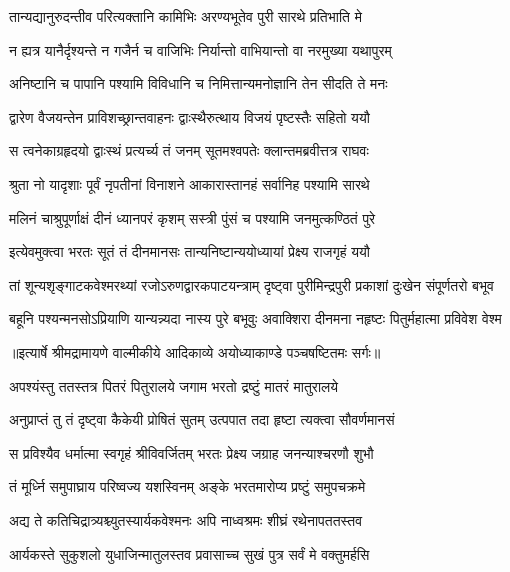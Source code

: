 \twolineshloka
{तान्यद्यानुरुदन्तीव परित्यक्तानि कामिभिः}
{अरण्यभूतेव पुरी सारथे प्रतिभाति मे} %

\twolineshloka
{न ह्यत्र यानैर्दृश्यन्ते न गजैर्न च वाजिभिः}
{निर्यान्तो वाभियान्तो वा नरमुख्या यथापुरम्} %

\twolineshloka
{अनिष्टानि च पापानि पश्यामि विविधानि च}
{निमित्तान्यमनोज्ञानि तेन सीदति ते मनः} %

\twolineshloka
{द्वारेण वैजयन्तेन प्राविशच्छ्रान्तवाहनः}
{द्वाःस्थैरुत्थाय विजयं पृष्टस्तैः सहितो ययौ} %

\twolineshloka
{स त्वनेकाग्रहृदयो द्वाःस्थं प्रत्यर्च्य तं जनम्}
{सूतमश्वपतेः क्लान्तमब्रवीत्तत्र राघवः} %

\twolineshloka
{श्रुता नो यादृशाः पूर्वं नृपतीनां विनाशने}
{आकारास्तानहं सर्वानिह पश्यामि सारथे} %

\twolineshloka
{मलिनं चाश्रुपूर्णाक्षं दीनं ध्यानपरं कृशम्}
{सस्त्री पुंसं च पश्यामि जनमुत्कण्ठितं पुरे} %

\twolineshloka
{इत्येवमुक्त्वा भरतः सूतं तं दीनमानसः}
{तान्यनिष्टान्ययोध्यायां प्रेक्ष्य राजगृहं ययौ} %

\fourlineindentedshloka
{तां शून्यशृङ्गाटकवेश्मरथ्यां}
{ रजोऽरुणद्वारकपाटयन्त्राम्}
{दृष्ट्वा पुरीमिन्द्रपुरी प्रकाशां}
{ दुःखेन संपूर्णतरो बभूव} %

\fourlineindentedshloka
{बहूनि पश्यन्मनसोऽप्रियाणि}
{ यान्यन्न्यदा नास्य पुरे बभूवुः}
{अवाक्शिरा दीनमना नहृष्टः}
{ पितुर्महात्मा प्रविवेश वेश्म} %


{॥इत्यार्षे श्रीमद्रामायणे वाल्मीकीये आदिकाव्ये अयोध्याकाण्डे पञ्चषष्टितमः सर्गः॥}


\twolineshloka
{अपश्यंस्तु ततस्तत्र पितरं पितुरालये}
{जगाम भरतो द्रष्टुं मातरं मातुरालये} %

\twolineshloka
{अनुप्राप्तं तु तं दृष्ट्वा कैकेयी प्रोषितं सुतम्}
{उत्पपात तदा हृष्टा त्यक्त्वा सौवर्णमानसं} %

\twolineshloka
{स प्रविश्यैव धर्मात्मा स्वगृहं श्रीविवर्जितम्}
{भरतः प्रेक्ष्य जग्राह जनन्याश्चरणौ शुभौ} %

\twolineshloka
{तं मूर्ध्नि समुपाघ्राय परिष्वज्य यशस्विनम्}
{अङ्के भरतमारोप्य प्रष्टुं समुपचक्रमे} %

\twolineshloka
{अद्य ते कतिचिद्रात्र्यश्च्युतस्यार्यकवेश्मनः}
{अपि नाध्वश्रमः शीघ्रं रथेनापततस्तव} %

\twolineshloka
{आर्यकस्ते सुकुशलो युधाजिन्मातुलस्तव}
{प्रवासाच्च सुखं पुत्र सर्वं मे वक्तुमर्हसि} %

